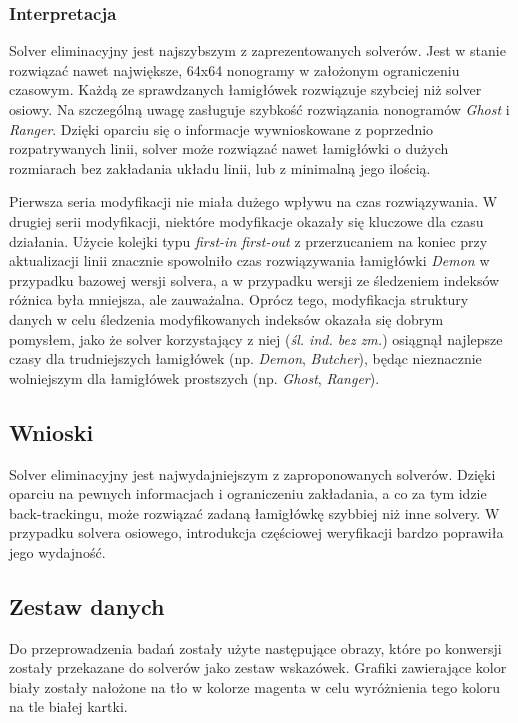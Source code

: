 \subsubsection{Interpretacja}
    Solver eliminacyjny jest najszybszym z zaprezentowanych solverów. Jest w stanie rozwiązać
nawet największe, 64x64 nonogramy w założonym ograniczeniu czasowym. Każdą ze sprawdzanych łamigłówek
rozwiązuje szybciej niż solver osiowy. Na szczególną uwagę zasługuje szybkość rozwiązania nonogramów
\textit{Ghost} i \textit{Ranger}. Dzięki oparciu się o informacje wywnioskowane z poprzednio
rozpatrywanych linii, solver może rozwiązać nawet łamigłówki o dużych rozmiarach bez zakładania
układu linii, lub z minimalną jego ilością.

    Pierwsza seria modyfikacji nie miała dużego wpływu na czas rozwiązywania. W drugiej serii
modyfikacji, niektóre modyfikacje okazały się kluczowe dla czasu działania. Użycie kolejki
typu \textit{first-in first-out} z przerzucaniem na koniec przy aktualizacji linii znacznie spowolniło
czas rozwiązywania łamigłówki \textit{Demon} w przypadku bazowej wersji solvera,
a w przypadku wersji ze śledzeniem indeksów różnica była mniejsza, ale zauważalna.
Oprócz tego, modyfikacja struktury danych w celu śledzenia modyfikowanych indeksów
okazała się dobrym pomysłem, jako że solver korzystający z niej (\textit{śl. ind. bez zm.}) osiągnął
najlepsze czasy dla trudniejszych łamigłówek (np. \textit{Demon}, \textit{Butcher}), 
będąc nieznacznie wolniejszym dla łamigłówek prostszych (np. \textit{Ghost}, \textit{Ranger}).


\subsection{Wnioski}
    Solver eliminacyjny jest najwydajniejszym z zaproponowanych solverów. Dzięki oparciu na pewnych
informacjach i ograniczeniu zakładania, a co za tym idzie back-trackingu, może rozwiązać zadaną
łamigłówkę szybbiej niż inne solvery. W przypadku solvera osiowego, introdukcja częściowej weryfikacji
bardzo poprawiła jego wydajność.


\subsection{Zestaw danych}
    Do przeprowadzenia badań zostały użyte następujące obrazy, które po konwersji zostały przekazane do solverów
jako zestaw wskazówek. Grafiki zawierające kolor biały zostały nałożone na tło w kolorze magenta
w celu wyróżnienia tego koloru na tle białej kartki.

